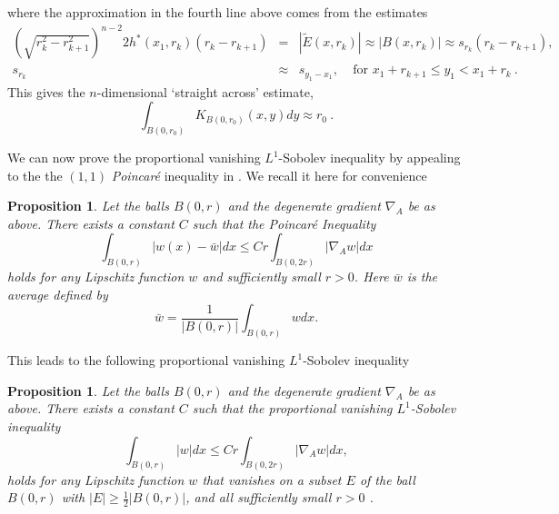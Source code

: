 \documentclass{amsart}
\theoremstyle{plain}
\newtheorem{proposition}[theorem]{Proposition}
\numberwithin{equation}{section}
\begin{document}
where the approximation in the fourth line above comes from the estimates%
\begin{eqnarray*}
	\left( \sqrt{r_{k}^{2}-r_{k+1}^{2}}\right) ^{n-2}2h^{\ast }\left(
	x_{1},r_{k}\right) \left( r_{k}-r_{k+1}\right) &=&\left\vert \widetilde{E}%
	\left( x,r_{k}\right) \right\vert \approx \left\vert B\left( x,r_{k}\right)
	\right\vert \approx s_{r_{k}}\left( r_{k}-r_{k+1}\right) , \\
	s_{r_{k}} &\approx &s_{y_{1}-x_{1}},\ \ \ \ \ \text{for }x_{1}+r_{k+1}\leq
	y_{1}<x_{1}+r_{k}\ .
\end{eqnarray*}%
This gives the $n$-dimensional `straight across' estimate, 
\begin{equation}
\int_{B\left( 0,r_{0}\right) }K_{B\left( 0,r_{0}\right) }\left( x,y\right)
dy\approx r_{0}\ .  \label{straight n}
\end{equation}

We can now prove the proportional vanishing $L^{1}$-Sobolev inequality by appealing to the the $\left( 1,1\right) $ \emph{Poincar\'{e}}
inequality in \cite{KoRiSaSh2}. We recall it here for convenience
\begin{proposition}
	\label{1 1 Poin'} Let the balls $B(0,r)$ and the degenerate gradient $\nabla
	_{A}$ be as above. There exists a constant $C$ such that the Poincar\'{e}
	Inequality 
	\begin{equation*}
	\int_{B(0,r)}\left\vert w(x)-\bar{w}\right\vert dx\leq
	Cr\int_{B(0,2r)}|\nabla _{A}w|dx
	\end{equation*}%
	holds for any Lipschitz function $w$ and sufficiently small $r>0$. Here $%
	\bar{w}$ is the average defined by 
	\begin{equation*}
	\bar{w}=\frac{1}{|B(0,r)|}\int_{B(0,r)}wdx.
	\end{equation*}
\end{proposition}

This leads to the following proportional vanishing $L^{1}$-Sobolev inequality
\begin{proposition}
	\label{vanishing}Let the balls $B(0,r)$ and the degenerate gradient $\nabla
	_{A}$ be as above. There exists a constant $C$ such that the proportional
	vanishing $L^{1}$-Sobolev inequality 
	\begin{equation}
	\int_{B(0,r)}\left\vert w\right\vert dx\leq Cr\int_{B(0,2r)}|\nabla _{A}w|dx,
	\label{proportional_sob}
	\end{equation}%
	holds for any Lipschitz function $w$ that vanishes on a subset $E$ of the
	ball $B\left( 0,r\right) $ with $\left\vert E\right\vert \geq \frac{1}{2}%
	\left\vert B\left( 0,r\right) \right\vert $, and all sufficiently small $r>0$%
	.
\end{proposition}
\end{document}
